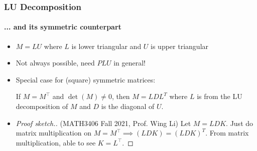 \documentclass{beamer}                             %
\begin{document}
\begin{frame}
\frametitle{LU Decomposition}
\framesubtitle{... and its symmetric counterpart}

\begin{itemize}
  \item<+-> \( M = LU \) where \( L \) is
    lower triangular and \( U \) is upper triangular
  \item<+-> Not always possible, need \( PLU \) in general!
  \item<+-> Special case for (square) symmetric matrices:
    \begin{theorem}
      If \( M = M^{\top} \) and \( \det(M) \neq 0 \), then \( M
      = L D L^T \) where \( L \) is from the LU decomposition
      of \( M \) and \( D \) is the diagonal of \( U \).
    \end{theorem}
  \item<+->
    \begin{proof}[Proof sketch.]
      (MATH3406 Fall 2021, Prof. Wing Li) Let \( M = LDK \). Just do
      matrix multiplication on \( M = M^{\top} \implies (LDK) = (LDK)^T \).
      From matrix multiplication, able to see \( K = L^{\top} \).
    \end{proof}
\end{itemize}
\end{frame}
\end{document}
